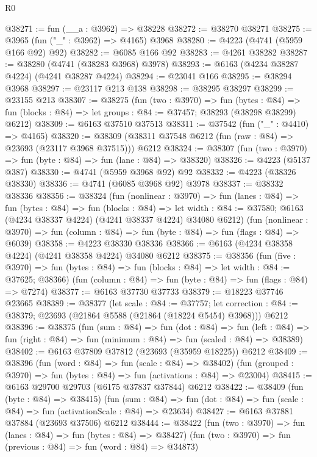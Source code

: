 \begin{lexlean}{R0}
\begin{coremodule}
@38271 := fun (__a : @3962) => @38228
@38272 := @38270 @38271
@38275 := @3965 (fun ("_" : @3962) => @4165) @3968
@38280 := @4223 (@4741 (@5959 @166 @92) @92)
@38282 := @6085 @166 @92
@38283 := @4261 @38282
@38287 := @38280 (@4741 (@38283 @3968) @3978)
@38293 := @6163 (@4234 @38287 @4224) (@4241 @38287 @4224)
@38294 := @23041 @166
@38295 := @38294 @3968
@38297 := @23117 @213 @138
@38298 := @38295 @38297
@38299 := @23155 @213
@38307 := @38275
    (fun (two : @3970) =>
    fun (bytes : @84) =>
    fun (blocks : @84) => let groups : @84 := @37457; @38293 (@38298 @38299) @6212)
@38309 := @6163 @37510 @37513
@38311 := @37542 (fun ("_" : @4410) => @4165)
@38320 := @38309 (@38311 @37548 @6212 (fun (raw : @84) => @23693 (@23117 @3968 @37515))) @6212
@38324 := @38307 (fun (two : @3970) => fun (byte : @84) => fun (lane : @84) => @38320)
@38326 := @4223 (@5137 @387)
@38330 := @4741 (@5959 @3968 @92) @92
@38332 := @4223 (@38326 @38330)
@38336 := @4741 (@6085 @3968 @92) @3978
@38337 := @38332 @38336
@38356 := @38324
    (fun (nonlinear : @3970) =>
    fun (lanes : @84) =>
    fun (bytes : @84) =>
    fun (blocks : @84) =>
    let width : @84 := @37580; @6163 (@4234 @38337 @4224) (@4241 @38337 @4224) @34080 @6212)
    (fun (nonlinear : @3970) =>
    fun (column : @84) => fun (byte : @84) => fun (flags : @84) => @6039)
@38358 := @4223 @38330 @38336
@38366 := @6163 (@4234 @38358 @4224) (@4241 @38358 @4224) @34080 @6212
@38375 := @38356
    (fun (five : @3970) =>
    fun (bytes : @84) => fun (blocks : @84) => let width : @84 := @37625; @38366)
    (fun (column : @84) => fun (byte : @84) => fun (flags : @84) => @7274)
@38377 := @6163 @37730 @37733
@38379 := @18223 @37746 @23665
@38389 := @38377
    (let scale : @84 := @37757;
    let correction : @84 := @38379; @23693 (@21864 @5588 (@21864 (@18224 @5454) @3968)))
    @6212
@38396 := @38375
    (fun (sum : @84) =>
    fun (dot : @84) =>
    fun (left : @84) => fun (right : @84) => fun (minimum : @84) => fun (scaled : @84) => @38389)
@38402 := @6163 @37809 @37812 (@23693 (@35959 @18225)) @6212
@38409 := @38396
    (fun (word : @84) => fun (scale : @84) => @38402)
    (fun (grouped : @3970) => fun (bytes : @84) => fun (activations : @84) => @23004)
@38415 := @6163 @29700 @29703 (@6175 @37837 @37844) @6212
@38422 := @38409
    (fun (byte : @84) => @38415)
    (fun (sum : @84) =>
    fun (dot : @84) => fun (scale : @84) => fun (activationScale : @84) => @23634)
@38427 := @6163 @37881 @37884 (@23693 @37506) @6212
@38444 := @38422
    (fun (two : @3970) => fun (lanes : @84) => fun (bytes : @84) => @38427)
    (fun (two : @3970) => fun (previous : @84) => fun (word : @84) => @34873)

\end{coremodule}
\end{lexlean}
